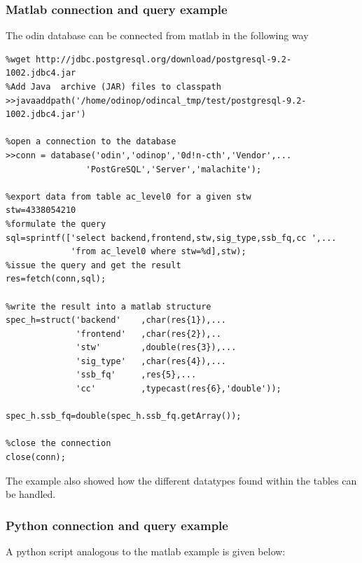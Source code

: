 \documentclass[12pt]{article}
\begin{document}
\subsubsection{Matlab connection and query example}
\label{sec:matlab}
The odin database can be connected from matlab in the
following way    
\begin{verbatim}
%wget http://jdbc.postgresql.org/download/postgresql-9.2-1002.jdbc4.jar
%Add Java  archive (JAR) files to classpath
>>javaaddpath('/home/odinop/odincal_tmp/test/postgresql-9.2-1002.jdbc4.jar')

%open a connection to the database
>>conn = database('odin','odinop','0d!n-cth','Vendor',...
                'PostGreSQL','Server','malachite'); 

%export data from table ac_level0 for a given stw
stw=4338054210
%formulate the query
sql=sprintf(['select backend,frontend,stw,sig_type,ssb_fq,cc ',...
             'from ac_level0 where stw=%d],stw);
%issue the query and get the result
res=fetch(conn,sql);

%write the result into a matlab structure
spec_h=struct('backend'    ,char(res{1}),...
              'frontend'   ,char(res{2}),.. 
              'stw'        ,double(res{3}),...
              'sig_type'   ,char(res{4}),...
              'ssb_fq'     ,res{5},...
              'cc'         ,typecast(res{6},'double'));

spec_h.ssb_fq=double(spec_h.ssb_fq.getArray());

%close the connection
close(conn);
\end{verbatim}
The example also showed how the different datatypes
found within the tables can be handled.
\clearpage
\newpage
\subsubsection{Python connection and query example}
\label{sec:python}
A python script analogous to the matlab example is given below: 
\end{document}
